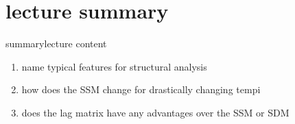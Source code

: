     \section[summary]{lecture summary}
        \begin{frame}{summary}{lecture content}
            \begin{enumerate}
                \item       name typical features for structural analysis
                \smallskip
                \item<2->   how does the SSM change for drastically changing tempi
                \smallskip
                \item<3->   does the lag matrix have any advantages over the SSM or SDM
            \end{enumerate}
        \end{frame}



